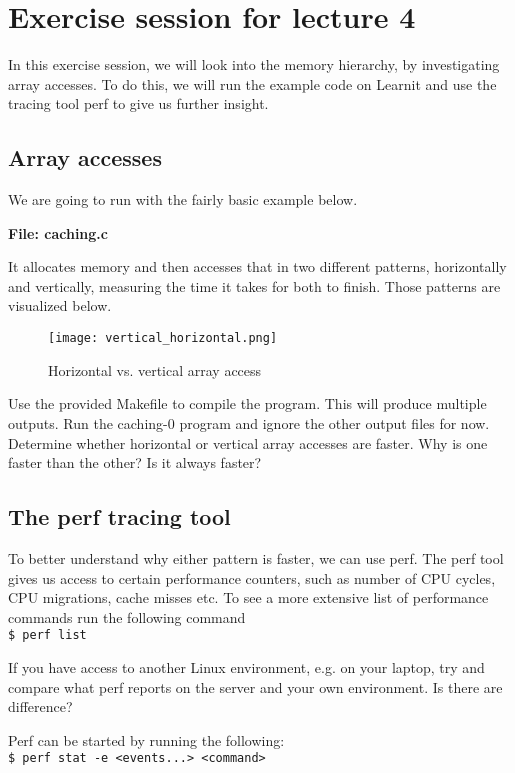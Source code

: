 \chapter*{Exercise session for lecture 4}
In this exercise session, we will look into the memory hierarchy, by investigating array accesses. To do this, we will run the example code on Learnit and use the tracing tool perf to give us further insight.

\section*{Array accesses}
We are going to run with the fairly basic example below.

\textbf{File: caching.c}


It allocates memory and then accesses that in two different patterns, horizontally and vertically, measuring the time it takes for both to finish. Those patterns are visualized below.

\begin{figure}[H]
    \centering
    \texttt{[image: vertical\_horizontal.png]}
    \caption{Horizontal vs. vertical array access}
    \label{fig:my_label}
\end{figure}

Use the provided Makefile to compile the program. This will produce multiple outputs. Run the caching-0 program and ignore the other output files for now. Determine whether horizontal or vertical array accesses are faster. Why is one faster than the other? Is it always faster?

\section*{The perf tracing tool}
To better understand why either pattern is faster, we can use perf. The perf tool gives us access to certain performance counters, such as number of CPU cycles, CPU migrations, cache misses etc. To see a more extensive list of performance commands run the following command \\
\texttt{\$ perf list}

If you have access to another Linux environment, e.g. on your laptop, try and compare what perf reports on the server and your own environment. Is there are difference?

Perf can be started by running the following: \\
\texttt{\$ perf stat -e <events...> <command>}

